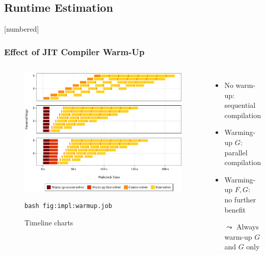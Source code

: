 \subsection{Runtime Estimation}
\begin{frame}[fragile]
  [numbered]
  \frametitle{Effect of JIT Compiler Warm-Up}
  \begin{columns}
    \begin{figure}
    \includegraphics[width=\textwidth]{figures/fig_impl_warmup1.pdf}%
    \renewcommand\thefigure{7.1} %
    \caption{Timeline charts}
    \lstinline!bash fig:impl:warmup.job!
    \end{figure}
    \begin{itemize}
      \item
        No warm-up:\\ sequential compilation
        \vspace{2em}
      \item
        Warming-up $G$:\\ parallel compilation
        \vspace{2em}
      \item
        Warming-up $F,G$:\\ no further benefit
        \vspace{2em}
      \pause
      \item[$\leadsto$]
        Always warm-up $G$\\ and $G$ only
    \end{itemize}
    \vspace{2em}
  \end{columns}
\end{frame}

